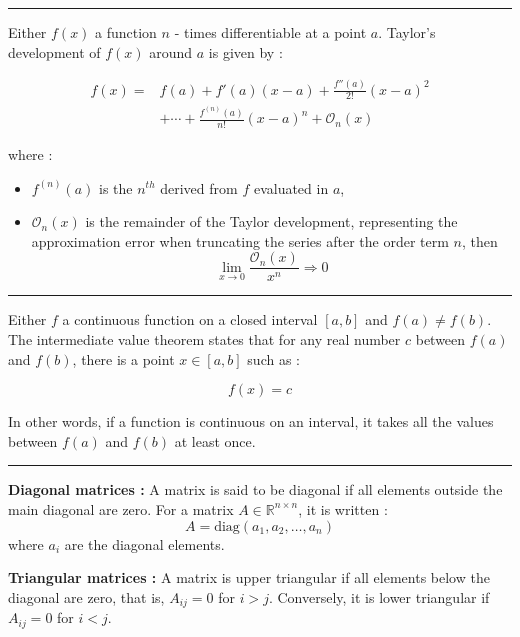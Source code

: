 \hrule
\begin{f}
 
Either \( f(x) \) a function \( n \) - times differentiable at a point \( a \). Taylor's development of \( f(x) \) around \( a \) is given by :

\begin{align*}
 f(x) =& f(a) + f'(a)(x - a) + \frac{f''(a)}{2!}(x - a)^2 \\
 &+ \cdots + \frac{f^{(n)}(a)}{n!}(x - a)^n + \mathcal{O}_n(x)
\end{align*}


where :
\begin{itemize}
    \item \( f^{(n)}(a) \) is the \( n^{th} \) derived from \( f \) evaluated in \( a \),
    \item \( \mathcal{O}_n(x) \) is the remainder of the Taylor development, representing the approximation error when truncating the series after the order term \( n \), then 
    \[
    \lim_{x\rightarrow 0}\frac{\mathcal{O}_n(x) }{x^n}\Rightarrow 0
    \]
\end{itemize}
\end{f}
\hrule
\begin{f} 

Either \( f \) a continuous function on a closed interval \([a, b]\) and \( f(a) \neq f(b) \). The intermediate value theorem states that for any real number \( c \) between \( f(a) \) and \( f(b) \), there is a point \( x \in [a, b] \) such as :

\[
f(x) = c
\]

In other words, if a function is continuous on an interval, it takes all the values between \( f(a) \) and \( f(b) \) at least once.
\end{f}
\hrule
\begin{f}
  
\textbf{Diagonal matrices :}
A matrix is said to be diagonal if all elements outside the main diagonal are zero. For a matrix \( A \in \mathbb{R}^{n \times n} \), it is written :
\[
A = \text{diag}(a_1, a_2, \dots, a_n)
\]
where \( a_i \) are the diagonal elements.

\textbf{Triangular matrices :}
A matrix is upper triangular if all elements below the diagonal are zero, that is, \( A_{ij} = 0 \) for \( i > j \). Conversely, it is lower triangular if \( A_{ij} = 0 \) for \( i < j \).
\end{f}
